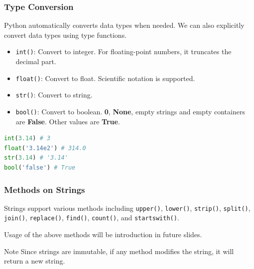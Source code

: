 \documentclass[beamer, en, version=2.0]{huangfusl-template}
\begin{document}
    \begin{frame}[fragile]
        \frametitle{Type Conversion}

        Python automatically converts data types when needed. We can also explicitly convert data types using type functions.

        \begin{itemize}
            \item {\footnotesize\verb|int()|}: Convert to integer. For floating-point numbers, it truncates the decimal part.
            \item {\footnotesize\verb|float()|}: Convert to float. Scientific notation is supported.
            \item {\footnotesize\verb|str()|}: Convert to string.
            \item {\footnotesize\verb|bool()|}: Convert to boolean. \textbf{0}, \textbf{None}, empty strings and empty containers are \textbf{False}. Other values are \textbf{True}.
        \end{itemize}
\begin{lstlisting}[language=python]
int(3.14) # 3
float('3.14e2') # 314.0
str(3.14) # '3.14'
bool('false') # True
\end{lstlisting}
    \end{frame}
    \begin{frame}[fragile]
        \frametitle{Methods on Strings}

        Strings support various methods including {\footnotesize\verb|upper()|}, {\footnotesize\verb|lower()|}, {\footnotesize\verb|strip()|}, {\footnotesize\verb|split()|}, {\footnotesize\verb|join()|}, {\footnotesize\verb|replace()|}, {\footnotesize\verb|find()|}, {\footnotesize\verb|count()|}, and {\footnotesize\verb|startswith()|}.

        Usage of the above methods will be introduction in future slides.

        \begin{block}{Note}
            Since strings are immutable, if any method modifies the string, it will return a new string.
        \end{block}
    \end{frame}
\end{document}
